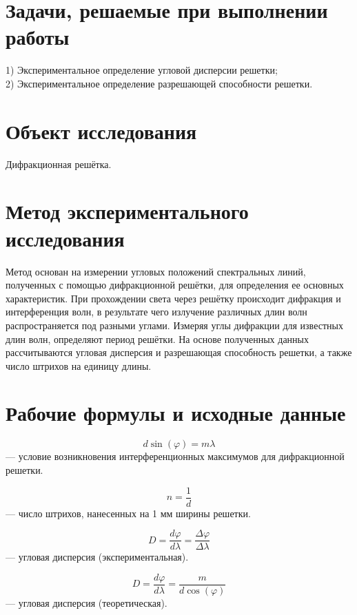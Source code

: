 \documentclass[a4paper,12pt]{article}
\begin{document}
\section{Задачи, решаемые при выполнении работы}
1) Экспериментальное определение угловой дисперсии решетки; \\
2) Экспериментальное определение разрешающей способности решетки.

\section{Объект исследования}
Дифракционная решётка.

\section{Метод экспериментального исследования}
Метод основан на измерении угловых положений спектральных линий, полученных с помощью дифракционной решётки, для определения ее основных характеристик. При прохождении света через решётку происходит дифракция и интерференция волн, в результате чего излучение различных длин волн распространяется под разными углами. Измеряя углы дифракции для известных длин волн, определяют период решётки. На основе полученных данных рассчитываются угловая дисперсия и разрешающая способность решетки, а также число штрихов на единицу длины.








\section{Рабочие формулы и исходные данные}

\begin{equation}
d \sin(\varphi) = m\lambda \tag{1}
\end{equation}
— условие возникновения интерференционных максимумов для дифракционной решетки.

\begin{equation}
n = \frac{1}{d} \tag{2}
\end{equation}
— число штрихов, нанесенных на 1 мм ширины решетки.

\begin{equation}
D = \frac{d\varphi}{d\lambda} = \frac{\Delta\varphi}{\Delta\lambda} \tag{3}
\end{equation}
— угловая дисперсия (экспериментальная).

\begin{equation}
D = \frac{d\varphi}{d\lambda} = \frac{m}{d \cos(\varphi)} \tag{4}
\end{equation}
— угловая дисперсия (теоретическая).
\end{document}
